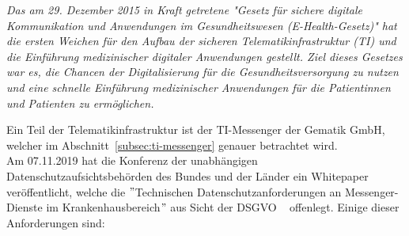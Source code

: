     \textit{Das am 29. Dezember 2015 in Kraft getretene "Gesetz für sichere digitale Kommunikation und Anwendungen im Gesundheitswesen (E-Health-Gesetz)" hat die ersten Weichen für den Aufbau der sicheren Telematikinfrastruktur (TI) und die Einführung medizinischer digitaler Anwendungen gestellt.
    Ziel dieses Gesetzes war es, die Chancen der Digitalisierung für die Gesundheitsversorgung zu nutzen und eine schnelle Einführung medizinischer Anwendungen für die Patientinnen und Patienten zu ermöglichen.}~\cite{ehealthgesetz}

    Ein Teil der Telematikinfrastruktur ist der TI-Messenger der Gematik GmbH, welcher im Abschnitt~\ref{subsec:ti-messenger} genauer betrachtet wird.\\
    Am 07.11.2019 hat die Konferenz der unabhängigen Datenschutzaufsichtsbehörden des Bundes und der Länder ein Whitepaper veröffentlicht, welche die \("\)Technischen Datenschutzanforderungen an Messenger-Dienste im\linebreak
    Krankenhausbereich\("\) aus Sicht der DSGVO ~\cite{datenschutzkonferenz} offenlegt.
    Einige dieser Anforderungen sind:
